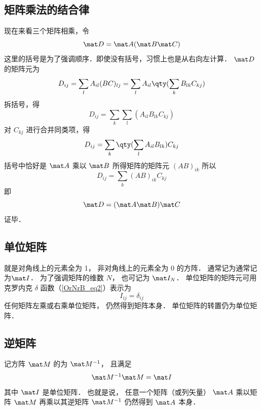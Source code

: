 \subsection{矩阵乘法的结合律}
现在来看三个矩阵相乘，令
\begin{equation}
\mat D = \mat A (\mat B\mat C)
\end{equation}
这里的括号是为了强调顺序．即使没有括号，习惯上也是从右向左计算． $\mat D$ 的矩阵元为
\begin{equation}
D_{ij} = \sum_l A_{il} (BC)_{lj} = \sum_l A_{il} \qty(\sum_k B_{lk} C_{kj} )
\end{equation}
拆括号，得
\begin{equation}
D_{ij} = \sum_k\sum_l  ( A_{il} B_{lk} C_{kj} )
\end{equation}
对 $C_{kj}$ 进行合并同类项，得
\begin{equation}
D_{ij} = \sum_k \qty(\sum_l A_{il} B_{lk} ) C_{kj} 
\end{equation}
括号中恰好是 $\mat A$ 乘以 $\mat B$ 所得矩阵的矩阵元 $(AB)_{ik}$ 所以
\begin{equation}
D_{ij} = \sum_k (AB)_{ik} C_{kj}
\end{equation}
即
\begin{equation}
\mat D = (\mat A\mat B)\mat C
\end{equation}
证毕．

\subsection{单位矩阵}
就是对角线上的元素全为 1， 非对角线上的元素全为 0 的方阵． 通常记为通常记为$\mat I$． 为了强调矩阵的维数 $N$， 也可记为 $\mat I_N$． 单位矩阵的矩阵元可用克罗内克 $\delta$ 函数（\autoref{OrNrB_eq2}）表示为
\begin{equation}
I_{ij} = \delta_{ij}
\end{equation} 
任何矩阵左乘或右乘单位矩阵， 仍然得到矩阵本身． 单位矩阵的转置仍为单位矩阵．

\subsection{逆矩阵}
记方阵 $\mat M$ 的为 $\mat M^{-1}$， 且满足
\begin{equation}
\mat M^{-1} \mat M = \mat I
\end{equation}
其中 $\mat I$ 是单位矩阵． 也就是说， 任意一个矩阵（或列矢量） $\mat A$ 乘以矩阵 $\mat M$ 再乘以其逆矩阵 $\mat M^{-1}$ 仍然得到 $\mat A$ 本身．

